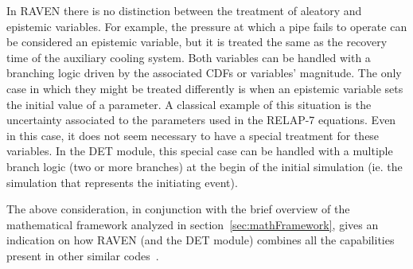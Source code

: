 In RAVEN there is no distinction between the treatment of aleatory and epistemic variables. For example, the pressure at which a pipe fails to operate can be considered an epistemic variable, but it is treated the same as the recovery time of the auxiliary cooling system. Both variables can be handled with a branching logic driven by the associated CDFs or variables’ magnitude. The only case in which they might be treated differently is when an epistemic variable sets the initial value of a parameter. A classical example of this situation is the uncertainty associated to the parameters used in the RELAP-7 equations. Even in this case, it does not seem necessary to have a special treatment for these variables. In the DET module, this special case can be handled  with a multiple branch logic (two or more branches) at the begin of the initial simulation (ie. the simulation that represents the initiating event).

The above consideration, in conjunction with the brief overview of the mathematical framework analyzed in section~\ref{sec:mathFramework}, gives an indication on how RAVEN (and the DET module) combines all the capabilities present in other similar codes~\cite{ADAPTHakobyan}.


